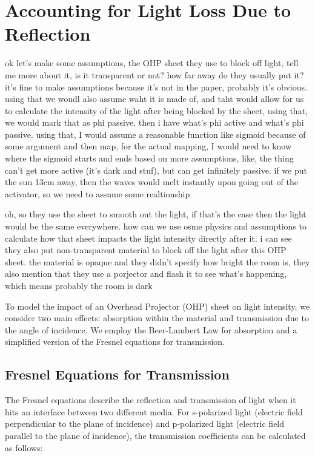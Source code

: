 \section{Accounting for Light Loss Due to Reflection}
ok let's make some assumptions, the OHP sheet they use to block off light, tell me more about it, is it transparent or not? how far away do they usually put it? it's fine to make assumptions because it's not in the paper, probably it's obvious. using that we woudl also assume waht it is made of, and taht would allow for us to calculate the intensity of the light after being blocked by the sheet, using that, we would mark that as phi passive. then i have what's phi active and what's phi passive. using that, I would assume a reasonable function like sigmoid because of some argument and then map, for the actual mapping, I would need to know where the sigmoid starts and ends based on more assumptions, like, the thing can't get more active (it's dark and stuf), but can get infinitely passive. if we put the sun 13cm away, then the waves would melt instantly upon going out of the activator, so we need to assume some realtionship


oh, so they use the sheet to smooth out the light, if that's the case then the light would be the same everywhere. how can we use osme physics and assumptions to calculate how that sheet impacts the light intensity directly after it.
i can see they also put non-transparent material to block off the light after this OHP sheet. the material is opaque and they didn't specify how bright the room is, they also mention that they use a porjector and flash it to see what's happening, which means probably the room is dark


To model the impact of an Overhead Projector (OHP) sheet on light intensity, we consider two main effects: absorption within the material and transmission due to the angle of incidence. We employ the Beer-Lambert Law for absorption and a simplified version of the Fresnel equations for transmission.

\subsection*{Fresnel Equations for Transmission}
The Fresnel equations describe the reflection and transmission of light when it hits an interface between two different media. For s-polarized light (electric field perpendicular to the plane of incidence) and p-polarized light (electric field parallel to the plane of incidence), the transmission coefficients can be calculated as follows:

